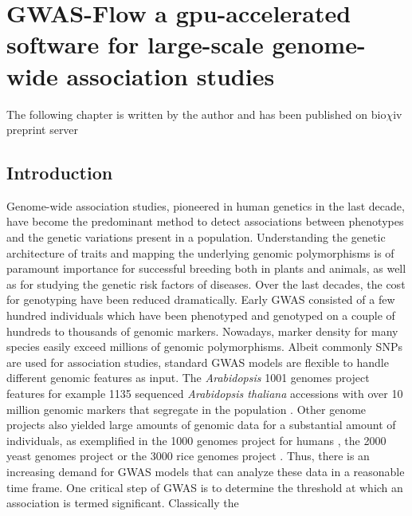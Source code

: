 
\chapter{GWAS-Flow a gpu-accelerated software for large-scale genome-wide association studies}

\label{Chapter3} %


The following chapter is written by the author and has been published on bio$\chi$iv preprint server \cite{Freudenthal_2019}


\section{Introduction}
Genome-wide association studies, pioneered in human genetics \cite{Hirschhorn2005} in the last decade,
have become the predominant method to detect associations between phenotypes and the genetic variations
present in a population. Understanding the genetic architecture of traits and mapping the underlying genomic
polymorphisms is of paramount importance for successful breeding both in plants and animals, as well as for
studying the genetic risk factors of diseases. 
Over the last decades, the cost for genotyping have been reduced dramatically.
Early GWAS consisted of a few hundred individuals which have been phenotyped and genotyped on a couple of hundreds to
thousands of genomic markers. Nowadays, marker density for many species easily exceed millions of genomic polymorphisms.
Albeit commonly SNPs are used for association studies, standard GWAS models are flexible to handle different genomic features
as input. The \textit{Arabidopsis} 1001 genomes project features for example 1135 sequenced \textit{Arabidopsis thaliana}
accessions with over 10 million genomic markers that segregate in the population \cite{1001genome}. Other genome projects
also yielded large amounts of genomic data for a substantial amount of individuals, as exemplified in the 1000 genomes
project for humans \cite{1000genome}, the 2000 yeast genomes project or the 3000 rice genomes project \cite{3000genome}. Thus, there is an increasing demand for GWAS models that can analyze these data in a reasonable time frame. 
One critical step of GWAS is to determine the threshold at which an association is termed significant. Classically the
